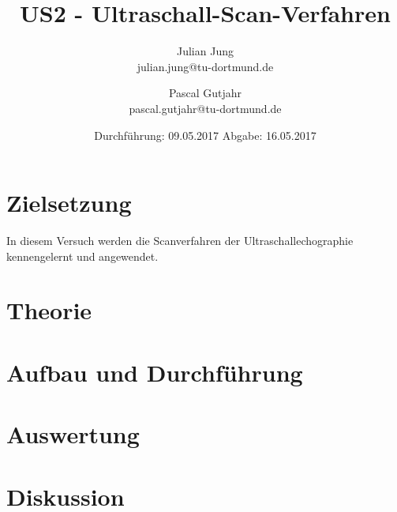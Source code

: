 

\title{US2 - Ultraschall-Scan-Verfahren}
\author{Julian Jung \\ julian.jung@tu-dortmund.de
  \and Pascal Gutjahr \\ pascal.gutjahr@tu-dortmund.de}
  \date{Durchführung: 09.05.2017
  \hspace{3em}
  Abgabe: 16.05.2017}
  
\maketitle
\newpage
\tableofcontents
\newpage
\section{Zielsetzung}
In diesem Versuch werden die Scanverfahren der Ultraschallechographie kennengelernt
und angewendet.
\section{Theorie}
 
\section{Aufbau und Durchführung}
 
\section{Auswertung}
\section{Diskussion}
% 
\printbibliography

